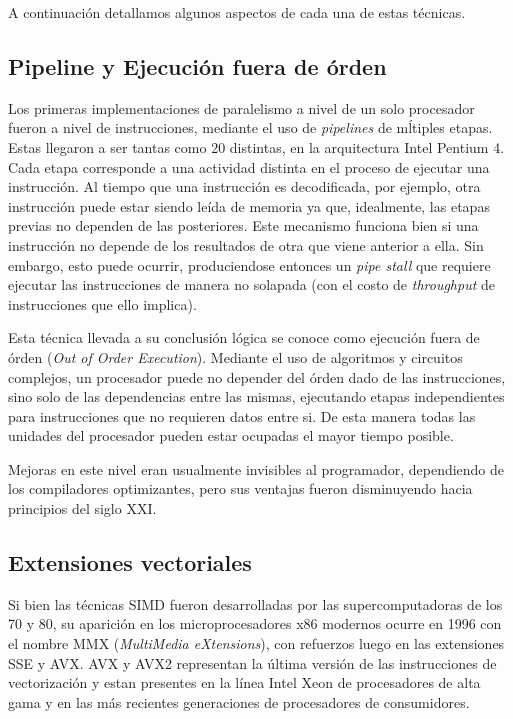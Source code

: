 A continuaci\'on detallamos algunos aspectos de cada una de estas t\'ecnicas.

\subsection{Pipeline y Ejecuci\'on fuera de \'orden}

Los primeras implementaciones de paralelismo a nivel de un solo procesador fueron a nivel de instrucciones, mediante el uso
de \textit{pipelines} de m\'ltiples etapas. Estas llegaron a ser tantas como 20 distintas, en la arquitectura
Intel Pentium 4. Cada etapa corresponde a una actividad distinta en el proceso de ejecutar una instrucci\'on.
Al tiempo que una instrucci\'on es decodificada, por ejemplo, otra instrucci\'on puede estar siendo le\'ida
de memoria ya que, idealmente, las etapas previas no dependen de las posteriores. Este mecanismo funciona bien
si una instrucci\'on no depende de los resultados de otra que viene anterior a ella. Sin embargo, esto puede
ocurrir, produciendose entonces un \textit{pipe stall} que requiere ejecutar las instrucciones de manera no solapada
(con el costo de \textit{throughput} de instrucciones que ello implica).

Esta t\'ecnica llevada a su conclusi\'on l\'ogica se conoce como ejecuci\'on fuera de \'orden (\textit{Out of Order
Execution}). Mediante el uso de algoritmos y circuitos complejos, un procesador puede no depender del \'orden dado
de las instrucciones, sino solo de las dependencias entre las mismas, ejecutando etapas independientes para
instrucciones que no requieren datos entre si. De esta manera todas las unidades del procesador pueden estar
ocupadas el mayor tiempo posible.

Mejoras en este nivel eran usualmente invisibles al programador, dependiendo de los compiladores optimizantes,
pero sus ventajas fueron disminuyendo hacia principios del siglo XXI.

\subsection{Extensiones vectoriales}

Si bien las t\'ecnicas SIMD fueron desarrolladas por las supercomputadoras de los 70 y 80, su aparici\'on en los
microprocesadores x86 modernos ocurre en 1996 con el nombre MMX (\textit{MultiMedia eXtensions}), con refuerzos luego en las
extensiones SSE y AVX. AVX y AVX2 representan la \'ultima versi\'on de las instrucciones de vectorizaci\'on y estan presentes
en la l\'inea Intel Xeon de procesadores de alta gama y en las m\'as recientes generaciones de procesadores de consumidores.


